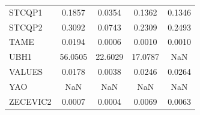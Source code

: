 \begin{longtable}{lcccc}
STCQP1   &   0.1857 &   0.0354 &   0.1362 &   0.1346 \\
STCQP2   &   0.3092 &   0.0743 &   0.2309 &   0.2493 \\
TAME     &   0.0194 &   0.0006 &   0.0010 &   0.0010 \\
UBH1     &  56.0505 &  22.6029 &  17.0787 &      NaN \\
VALUES   &   0.0178 &   0.0038 &   0.0246 &   0.0264 \\
YAO      &      NaN &      NaN &      NaN &      NaN \\
ZECEVIC2 &   0.0007 &   0.0004 &   0.0069 &   0.0063 \\
\end{longtable}
